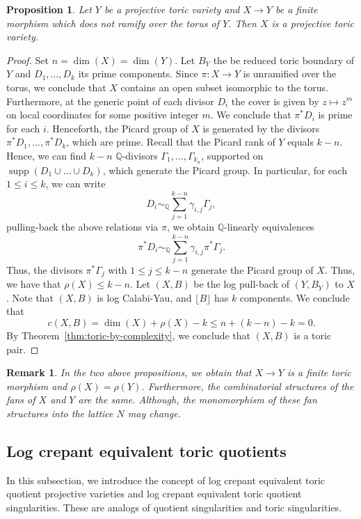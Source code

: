 \documentclass{amsart}
\newcommand{\supp}{\operatorname{supp}}
\renewcommand{\qq}{\mathbb{Q}}
\newtheorem{proposition}[theorem]{Proposition}
\newtheorem{remark}[theorem]{Remark}
\theoremstyle{remark}
\numberwithin{equation}{section}
\begin{document}
\begin{proposition}\label{prop:cover-toric-unramified-torus-toric}
Let $Y$ be a projective toric variety and $X\rightarrow Y$ be a finite morphism which does not ramify over the torus of $Y$.
Then $X$ is a projective toric variety.
\end{proposition}

\begin{proof}
Set $n=\dim(X)=\dim(Y)$.
Let $B_Y$ the be reduced toric boundary of $Y$ and $D_1,\dots,D_k$ its prime components.
Since $\pi\colon X\rightarrow Y$ is unramified over the torus, we conclude that $X$ contains an open subset isomorphic to the torus.
Furthermore, at the generic point of each divisor $D_i$
the cover is given by $z\mapsto z^m$ on local coordinates 
for some positive integer $m$.
We conclude that $\pi^*D_i$ is prime for each $i$.
Henceforth, the Picard group of $X$ is generated by the divisors $\pi^*D_1,\dots,\pi^*D_k$, which are prime.
Recall that the Picard rank of $Y$ equals $k-n$.
Hence, we can find $k-n$ $\qq$-divisors $\Gamma_1,\dots,\Gamma_{k_n}$, supported on $\supp(D_1\cup\dots\cup D_k)$, which generate
the Picard group.
In particular, for each $1\leq i\leq k$, we can write
\[
D_i\sim_\qq \sum_{j=1}^{k-n} \gamma_{i,j}\Gamma_j,
\]
pulling-back the above relations via $\pi$, we obtain
$\qq$-linearly equivalences
\[
\pi^*D_i \sim_\qq \sum_{j=1}^{k-n} \gamma_{i,j}\pi^*\Gamma_j.
\]
Thus, the divisors $\pi^*\Gamma_j$ with $1\leq j\leq k-n$
generate the Picard group of $X$.
Thus, we have that $\rho(X)\leq k-n$.
Let $(X,B)$ be the log pull-back of $(Y,B_Y)$ to $X$.
Note that $(X,B)$ is log Calabi-Yau, 
and $\lfloor B\rfloor$ has $k$ components.
We conclude that 
\[
c(X,B)= \dim(X) + \rho(X) - k \leq 
n+(k-n)-k = 0.
\]
By Theorem~\ref{thm:toric-by-complexity}, 
we conclude that $(X,B)$ is a toric pair.
\end{proof}

\begin{remark}{\em
In the two above propositions, we obtain that $X\rightarrow Y$ is a finite toric morphism 
and $\rho(X)=\rho(Y)$.
Furthermore, the combinatorial structures of the fans of $X$ and $Y$ are the same.
Although, 
the monomorphism of these fan structures 
into the lattice $N$ may change.}
\end{remark}

\subsection{Log crepant equivalent  toric quotients}
In this subsection, we introduce the concept
of log crepant equivalent  toric quotient projective varieties
and log crepant equivalent  toric quotient singularities.
These are analogs of quotient singularities and toric singularities.
\end{document}
